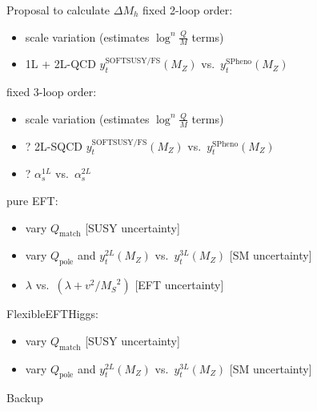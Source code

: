\documentclass[hyperref={pdfpagelabels=false},ngerman]{beamer}
\newcommand{\MS}{\ensuremath{M_S}}
\begin{document}
\begin{frame}{Proposal to calculate $\Delta M_h$}
  fixed 2-loop order:
  \begin{itemize}
  \item scale variation (estimates $\log^n \frac{Q}{M}$ terms)
  \item 1L + 2L-QCD $y_t^{\text{SOFTSUSY/FS}}(M_Z)$ vs.\ $y_t^{\text{SPheno}}(M_Z)$
  \end{itemize}
  fixed 3-loop order:
  \begin{itemize}
  \item scale variation (estimates $\log^n \frac{Q}{M}$ terms)
  \item ? 2L-SQCD $y_t^{\text{SOFTSUSY/FS}}(M_Z)$ vs.\ $y_t^{\text{SPheno}}(M_Z)$
  \item ? $\alpha_s^{1L}$ vs.\ $\alpha_s^{2L}$
  \end{itemize}
  pure EFT:
  \begin{itemize}
  \item vary $Q_\text{match}$ [SUSY uncertainty]
  \item vary $Q_\text{pole}$ and $y_t^{2L}(M_Z)$ vs.\ $y_t^{3L}(M_Z)$ [SM uncertainty]
  \item $\lambda$ vs.\ $(\lambda + v^2/\MS^2)$ [EFT uncertainty]
  \end{itemize}
  FlexibleEFTHiggs:
  \begin{itemize}
  \item vary $Q_\text{match}$ [SUSY uncertainty]
  \item vary $Q_\text{pole}$ and $y_t^{2L}(M_Z)$ vs.\ $y_t^{3L}(M_Z)$ [SM uncertainty]
  \end{itemize}
\end{frame}


\begin{frame}[noframenumbering]
  \begin{center}
    \Huge Backup
  \end{center}
\end{frame}
\end{document}

